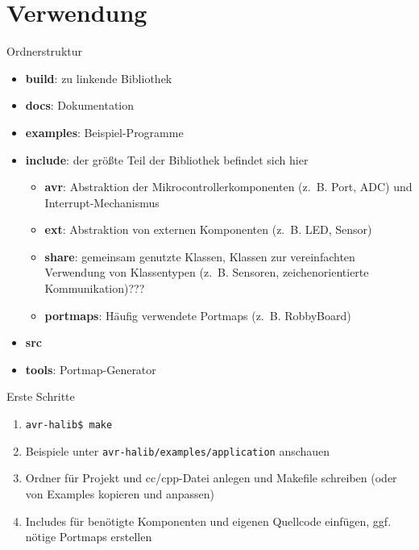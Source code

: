 \documentclass[11pt]{beamer}
\begin{document}
\section{Verwendung}


\begin{frame}{Ordnerstruktur}

\begin{small}\begin{itemize}
	\item \textbf{build}: zu linkende Bibliothek
 	\item \textbf{docs}: Dokumentation
	\item \textbf{examples}: Beispiel-Programme
	\item \textbf{include}: der größte Teil der Bibliothek befindet sich hier 
	\begin{itemize}
		\item \textbf{avr}: Abstraktion der Mikrocontrollerkomponenten (z.~B. Port, ADC) und Interrupt-Mechanismus
		\item \textbf{ext}: Abstraktion von externen Komponenten (z.~B. LED, Sensor)
		\item \textbf{share}: gemeinsam genutzte Klassen, Klassen zur vereinfachten Verwendung von Klassentypen (z.~B. Sensoren, zeichenorientierte Kommunikation)???
		\item \textbf{portmaps}: Häufig verwendete Portmaps (z.~B. RobbyBoard)
	\end{itemize}
	\item \textbf{src}
	\item \textbf{tools}: Portmap-Generator
\end{itemize}
\end{small}\end{frame}


\begin{frame}[fragile]{Erste Schritte}
\begin{enumerate}
	\item \verb!avr-halib$ make!
	\item Beispiele unter \verb!avr-halib/examples/application! anschauen
	\item Ordner für Projekt und cc/cpp-Datei anlegen und Makefile schreiben (oder von Examples kopieren und anpassen)
	\item Includes für benötigte Komponenten und eigenen Quellcode einfügen, ggf. nötige Portmaps erstellen
\end{enumerate}
\end{frame}
\end{document}

